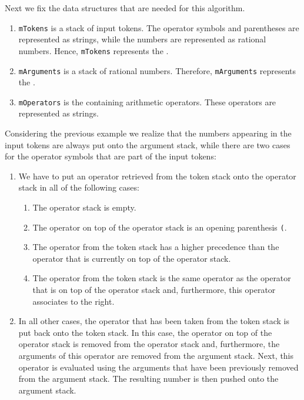 Next we fix the data structures
that are needed for this algorithm.
\begin{enumerate}
\item \texttt{mTokens} is a stack of input tokens.  The operator symbols and parentheses are
      represented as strings, while the numbers are represented as rational numbers.  Hence, \texttt{mTokens}
      represents the .
\item \texttt{mArguments} is a stack of rational numbers.  Therefore, \texttt{mArguments} represents the
      .
\item \texttt{mOperators} is the  containing arithmetic operators.  These operators
      are represented as strings.
\end{enumerate}
Considering the previous example we realize that the numbers appearing in the input tokens are always put onto the argument stack,
while there are two cases for the operator symbols that are part of the input tokens:
\begin{enumerate}
\item We have to put an operator retrieved from the token stack onto the operator stack in all of the following cases:
      \begin{enumerate}
      \item The operator stack is empty.
      \item The operator on top of the operator stack is an opening parenthesis \texttt{(}. 
      \item The operator from the token stack has a higher precedence than the operator that is currently on top of the
            operator stack.
      \item The operator from the token stack is the same operator as the operator that is on top of the operator stack and, furthermore,
            this operator associates to the right.
      \end{enumerate}
\item In all other cases, the operator that has been taken from the token stack is put back onto the
      token stack.  In this case, the operator on top of the operator stack is removed from the
      operator stack and, furthermore, the arguments of this operator are removed from the argument
      stack.  Next, this operator is evaluated using the arguments that have been previously removed
      from the argument stack.   The resulting number is then pushed onto the argument stack.
\end{enumerate}

